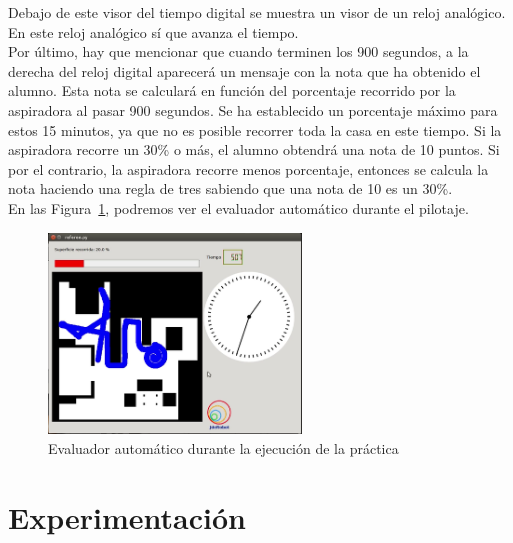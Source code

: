Debajo de este visor del tiempo digital se muestra un visor de un reloj analógico. En este reloj analógico sí que avanza el tiempo.\\


Por último, hay que mencionar que cuando terminen los 900 segundos, a la derecha del reloj digital aparecerá un mensaje con la nota que ha obtenido el alumno. Esta nota se calculará en función del porcentaje recorrido por la aspiradora al pasar 900 segundos. Se ha establecido un porcentaje máximo para estos 15 minutos, ya que no es posible recorrer toda la casa en este tiempo. Si la aspiradora recorre un 30\% o más, el alumno obtendrá una nota de 10 puntos. Si por el contrario, la aspiradora recorre menos porcentaje, entonces se calcula la nota haciendo una regla de tres sabiendo que una nota de 10 es un 30\%.\\

En las Figura~\ref{fig.Referee_Vacuum2}, podremos ver el evaluador automático durante el pilotaje.

\begin{figure}[H]
  \begin{center}
    \includegraphics[width=0.6\textwidth]{figures/Vacuum/Referee_Vacuum2.png}
		\caption{Evaluador automático durante la ejecución de la práctica}
		\label{fig.Referee_Vacuum2}
		\end{center}
\end{figure}


\section{Experimentación}

